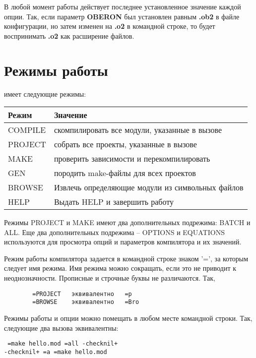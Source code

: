 В любой момент работы действует последнее установленное значение
каждой опции. Так, если параметр
{\bf OBERON} был установлен равным {\bf.ob2}  
в файле конфигурации, но затем изменен на 
{\bf.o2} в командной строке, то
\xds{} будет воспринимать {\bf.o2} как расширение \ot{} файлов.

\section{Режимы работы \XDS{}}\label{xc:modes}
\label{xc:mode}

\xds{} имеет следующие режимы:
\begin{center}
\begin{tabular}{|l|l|}\hline
\bf Режим   & \bf Значение                                  \\ \hline
    COMPILE & скомпилировать все модули, указанные в вызове  \\ \hline
    PROJECT & собрать все проекты, указанные в вызове        \\ \hline
    MAKE    & проверить зависимости и перекомпилировать      \\ \hline
    GEN     & породить make-файлы для всех проектов          \\ \hline
    BROWSE  & Извлечь определяющие модули из символьных файлов\\ \hline
    HELP    & Выдать HELP и завершить работу                 \\ \hline
\end{tabular}
\end{center}

Режимы PROJECT и MAKE имеют два дополнительных подрежима:
BATCH и ALL. Еще два дополнительных подрежима --
OPTIONS и EQUATIONS используются для просмотра опций и параметров
компилятора и их значений.

Режим работы компилятора задается в командной строке знаком
'=', за которым следует имя режима. Имя режима можно сокращать, если 
это не приводит к неоднозначности. Прописные и строчные буквы не 
различаются. Так,
\begin{verbatim}
        =PROJECT   эквивалентно   =p
        =BROWSE    эквивалентно   =Bro
\end{verbatim}

Режимы работы и опции можно помещать в любом месте командной строки.
Так, следующие два вызова эквивалентны:
\begin{flushleft} \tt
    \xc{} =make hello.mod =all -checknil+ \\
    \xc{} -checknil+ =a =make hello.mod
\end{flushleft}

